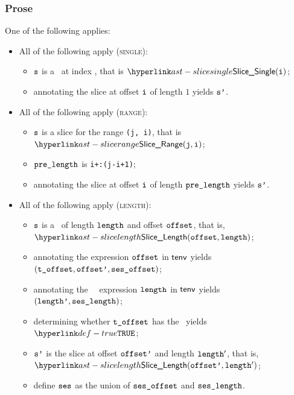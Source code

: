 \subsubsection{Prose}
One of the following applies:
\begin{itemize}
  \item All of the following apply (\textsc{single}):
  \begin{itemize}
    \item $\texttt{s}$ is a \singleslice\ at index \vi, that is $\SliceSingle(\vi)$;
    \item annotating the slice at offset $\texttt{i}$ of length $1$ yields $\texttt{s'}$\ProseOrTypeError.
  \end{itemize}

  \item All of the following apply (\textsc{range}):
  \begin{itemize}
    \item $\texttt{s}$ is a slice for the range \texttt{(j, i)}, that is $\SliceRange(\vj, \vi)$;
    \item $\texttt{pre\_length}$ is \texttt{i+:(j-i+1)};
    \item annotating the slice at offset $\texttt{i}$ of length $\texttt{pre\_length}$ yields $\texttt{s'}$\ProseOrTypeError.
  \end{itemize}

  \item All of the following apply (\textsc{length}):
  \begin{itemize}
    \item $\texttt{s}$ is a \lengthslice\ of length $\texttt{length}$ and offset $\texttt{offset}$, that is, \\
          $\SliceLength(\eoffset, \elength)$;
    \item annotating the expression $\texttt{offset}$ in $\textsf{tenv}$ yields \\
          $(\texttt{t\_offset}, \texttt{offset'}, \texttt{ses\_offset})$\ProseOrTypeError;
    \item annotating the \symbolicallyevaluable\ \constrainedinteger\ expression $\texttt{length}$ in $\textsf{tenv}$ yields
    $(\texttt{length'}, \texttt{ses\_length})$\ProseOrTypeError;
    \item determining whether $\texttt{t\_offset}$ has the \structureofinteger\ yields $\True$\ProseOrTypeError;
    \item $\texttt{s'}$ is the slice at offset $\texttt{offset'}$ and length $\texttt{length}'$, that is,\\
     $\SliceLength(\eoffsetp, \elength')$;
     \item define $\texttt{ses}$ as the union of $\texttt{ses\_offset}$ and $\texttt{ses\_length}$.
  \end{itemize}


\end{itemize}
